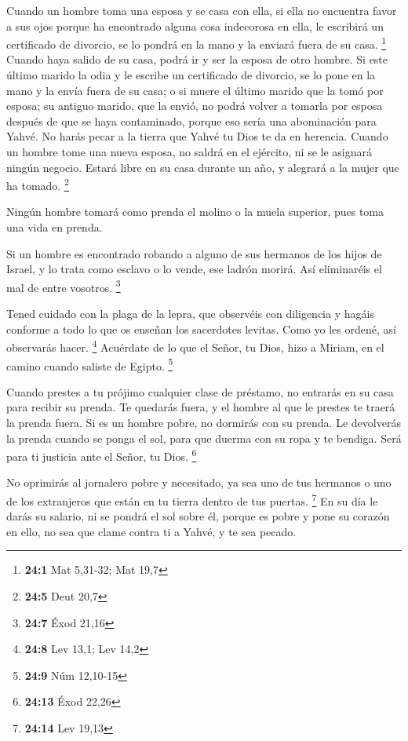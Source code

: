  Cuando un hombre toma una esposa y se casa con ella, si
ella no encuentra favor a sus ojos porque ha encontrado alguna cosa
indecorosa en ella, le escribirá un certificado de divorcio, se lo
pondrá en la mano y la enviará fuera de su casa. \footnote{\textbf{24:1}
  Mat 5,31-32; Mat 19,7}  Cuando haya salido de su casa,
podrá ir y ser la esposa de otro hombre.  Si este último
marido la odia y le escribe un certificado de divorcio, se lo pone en la
mano y la envía fuera de su casa; o si muere el último marido que la
tomó por esposa;  su antiguo marido, que la envió, no
podrá volver a tomarla por esposa después de que se haya contaminado,
porque eso sería una abominación para Yahvé. No harás pecar a la tierra
que Yahvé tu Dios te da en herencia.  Cuando un hombre
tome una nueva esposa, no saldrá en el ejército, ni se le asignará
ningún negocio. Estará libre en su casa durante un año, y alegrará a la
mujer que ha tomado. \footnote{\textbf{24:5} Deut 20,7}

 Ningún hombre tomará como prenda el molino o la muela
superior, pues toma una vida en prenda.

 Si un hombre es encontrado robando a alguno de sus
hermanos de los hijos de Israel, y lo trata como esclavo o lo vende, ese
ladrón morirá. Así eliminaréis el mal de entre vosotros. \footnote{\textbf{24:7}
  Éxod 21,16}

 Tened cuidado con la plaga de la lepra, que observéis con
diligencia y hagáis conforme a todo lo que os enseñan los sacerdotes
levitas. Como yo les ordené, así observarás hacer. \footnote{\textbf{24:8}
  Lev 13,1; Lev 14,2}  Acuérdate de lo que el Señor, tu
Dios, hizo a Miriam, en el camino cuando saliste de Egipto. \footnote{\textbf{24:9}
  Núm 12,10-15}

 Cuando prestes a tu prójimo cualquier clase de préstamo,
no entrarás en su casa para recibir su prenda.  Te
quedarás fuera, y el hombre al que le prestes te traerá la prenda fuera.
 Si es un hombre pobre, no dormirás con su prenda.
 Le devolverás la prenda cuando se ponga el sol, para que
duerma con su ropa y te bendiga. Será para ti justicia ante el Señor, tu
Dios. \footnote{\textbf{24:13} Éxod 22,26}

 No oprimirás al jornalero pobre y necesitado, ya sea uno
de tus hermanos o uno de los extranjeros que están en tu tierra dentro
de tus puertas. \footnote{\textbf{24:14} Lev 19,13}  En
su día le darás su salario, ni se pondrá el sol sobre él, porque es
pobre y pone su corazón en ello, no sea que clame contra ti a Yahvé, y
te sea pecado.

